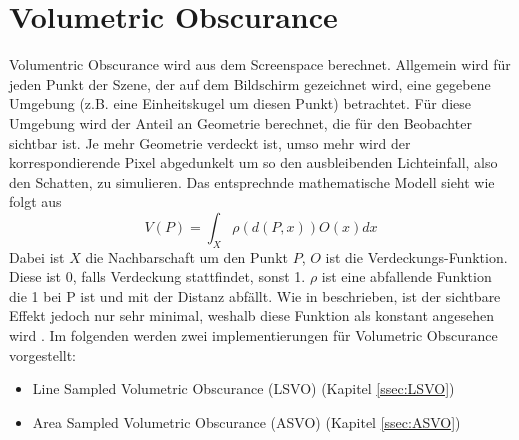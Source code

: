 \documentclass[runningheaders,a4paper]{llncs}
\begin{document}
\section{Volumetric Obscurance}

Volumentric Obscurance wird aus dem Screenspace berechnet. Allgemein wird für jeden Punkt der Szene, der auf
dem Bildschirm gezeichnet wird, eine gegebene Umgebung (z.B. eine Einheitskugel um diesen Punkt) betrachtet.
Für diese Umgebung wird der Anteil an Geometrie berechnet, die für den Beobachter sichtbar ist. Je mehr Geometrie
verdeckt ist, umso mehr wird der korrespondierende Pixel abgedunkelt um so den ausbleibenden Lichteinfall,
also den Schatten, zu simulieren.
Das entsprechnde mathematische Modell sieht wie folgt aus \cite{voPaper}
$$
V(P) = \int_{X} \rho (d(P,x))O(x)dx
$$
Dabei ist $X$ die Nachbarschaft um den Punkt $P$, $O$ ist die Verdeckungs-Funktion. Diese
ist 0, falls Verdeckung stattfindet, sonst 1. $\rho$ ist eine abfallende Funktion
die 1 bei P ist und mit der Distanz abfällt. Wie in \cite{voPaper} beschrieben, ist der 
sichtbare Effekt jedoch nur sehr minimal, weshalb diese Funktion als konstant angesehen 
wird \cite{voPaper}.
Im folgenden werden zwei implementierungen für Volumetric Obscurance vorgestellt:
\begin{itemize}
    \item Line Sampled Volumetric Obscurance (LSVO) (Kapitel \ref{ssec:LSVO})
    \item Area Sampled Volumetric Obscurance (ASVO) (Kapitel \ref{ssec:ASVO})
\end{itemize}
\end{document}
